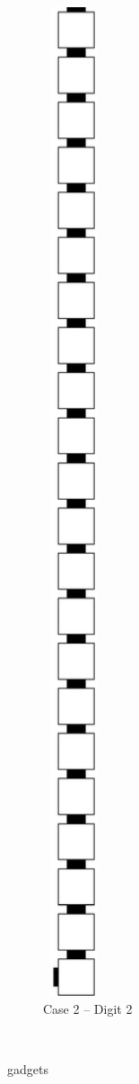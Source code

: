 \begin{enumerate}[label={--}]
\begin{figure}[h]
                    \begin{subfigure}[t]{0.2\textwidth}
                        \centering
                        \includegraphics[width=0.2\textwidth]{warping/post_warp_case2_digit2_msr}
                        \caption{\label{fig:warping/post_warp_case2_digit2_msr} Case 2 -- Digit 2}
                    \end{subfigure}%
                    ~
                    \caption{\label{fig:post_warp_gadgets} {\postwarp} gadgets }
                \end{figure}

        \end{enumerate}

